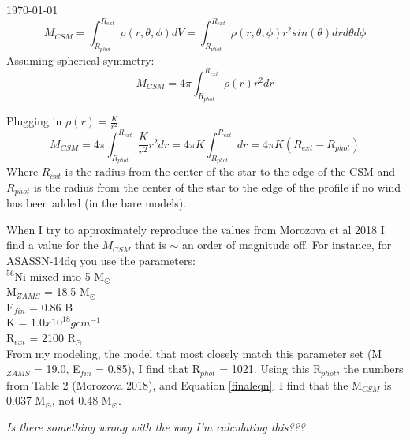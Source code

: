 \documentclass[11pt, oneside]{article}   	%
\begin{document}
\today
\begin{equation}
M_{CSM} = \int_{R_{phot}}^{R_{ext}} \rho(r, \theta, \phi) dV = \int_{R_{phot}}^{R_{ext}} \rho(r, \theta, \phi) r^{2} sin(\theta) dr d\theta d\phi
\end{equation}
Assuming spherical symmetry:
\begin{equation}
M_{CSM} = 4\pi\int_{R_{phot}}^{R_{ext}} \rho(r) r^{2} dr
\end{equation}

Plugging in $\rho(r) = \frac{K}{r^2}$
\begin{equation} \label{finaleqn}
M_{CSM} = 4\pi\int_{R_{phot}}^{R_{ext}} \frac{K}{r^{2}} r^{2} dr = 4\pi K \int_{R_{phot}}^{R_{ext}} dr = 4\pi K (R_{ext} - R_{phot})
\end{equation}
Where $R_{ext}$ is the radius from the center of the star to the edge of the CSM and $R_{phot}$ is the radius from the center of the star to the edge of the profile if no wind has been added (in the bare models).

When I try to approximately reproduce the values from Morozova et al 2018 I find a value for the $M_{CSM}$ that is $\sim$ an order of magnitude off. For instance, for ASASSN-14dq you use the parameters:\\
\indent ${}^{56}$Ni mixed into 5 M$_{\odot}$ \\
\indent M$_{ZAMS}$ = 18.5 M$_{\odot}$ \\
\indent E$_{fin}$ = 0.86 B\\
\indent K = $1.0x10^{18} g cm^{-1} $\\
\indent R$_{ext}$ = 2100 R$_{\odot}$\\

From my modeling, the model that most closely match this parameter set (M$_{ZAMS}$ = 19.0, E$_{fin}$ = 0.85), I find that R$_{phot}$ = 1021.
Using this R$_{phot}$, the numbers from Table 2 (Morozova 2018), and Equation \ref{finaleqn}, I find that the M$_{CSM}$ is 0.037 M$_{\odot}$, not 
0.48 M$_{\odot}$.

{\it Is there something wrong with the way I'm calculating this???}

%
%
%
%
%
%
%
%
\end{document}
